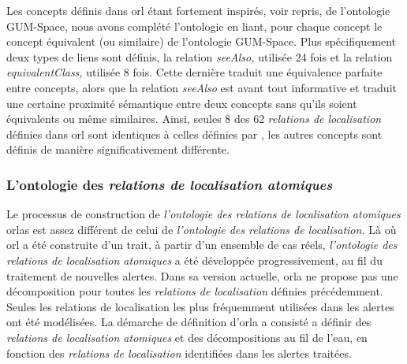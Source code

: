 Les concepts définis dans \ac{orl} étant fortement inspirés, voir
repris, de l'ontologie GUM-Space, nous avons complété l'ontologie en
liant, pour chaque concept le concept équivalent (ou similaire) de
l'ontologie GUM-Space. Plus spécifiquement deux types de liens sont
définis, la relation \emph{seeAlso,} utilisée 24 fois et la relation
\emph{equivalentClass,} utilisée 8 fois. Cette dernière traduit une
équivalence parfaite entre concepts, alors que la relation
\emph{seeAlso} est avant tout informative et traduit une certaine
proximité sémantique entre deux concepts sans qu'ils soient
équivalents ou même similaires. Ainsi, seules 8 des 62 \emph{relations
  de localisation} définies dans \ac{orl} sont identiques à celles
définies par \textcite{Bateman2010}, les autres concepts sont définis
de manière significativement différente.

%   

\subsubsection{L'ontologie des \emph{relations de localisation
    atomiques}}

Le processus de construction de \emph{l'ontologie des relations de
  localisation atomiques} \acp{orla} est assez différent de celui de
\emph{l'ontologie des relations de localisation.} Là où \ac{orl} a été
construite d'un trait, à partir d'un ensemble de cas réels,
\emph{l'ontologie des relations de localisation atomiques} a été
développée progressivement, au fil du traitement de nouvelles
alertes. Dans sa version actuelle, \ac{orla} ne propose pas une
décomposition pour toutes les \emph{relations de localisation}
définies précédemment. Seules les relations de localisation les plus
fréquemment utilisées dans les alertes ont été modélisées.  La
démarche de définition d'\ac{orla} a consisté a définir des
\emph{relations de localisation atomiques} et des décompositions au
fil de l'eau, en fonction des \emph{relations de localisation}
identifiées dans les alertes traitées.

